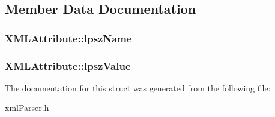 \subsection{Member Data Documentation}
\hypertarget{structXMLAttribute_a59d24e06998261f56a5b8e2f2b20ea9e}{
\subsubsection[{lpsz\-Name}]{ X\-M\-L\-Attribute\-::lpsz\-Name}}\label{structXMLAttribute_a59d24e06998261f56a5b8e2f2b20ea9e}
\hypertarget{structXMLAttribute_a2e1317aefc63d17247e3e12091b90618}{
\subsubsection[{lpsz\-Value}]{ X\-M\-L\-Attribute\-::lpsz\-Value}}\label{structXMLAttribute_a2e1317aefc63d17247e3e12091b90618}


The documentation for this struct was generated from the following file\-:\begin{DoxyCompactItemize}
\item 
\hyperlink{xmlParser_8h}{xml\-Parser.\-h}\end{DoxyCompactItemize}
